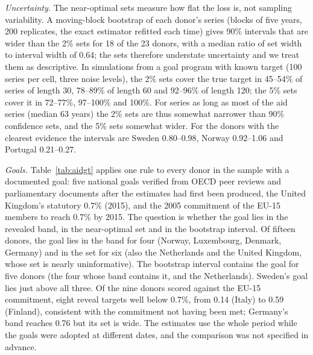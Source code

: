 \documentclass[pdflatex,sn-basic]{sn-jnl}
\theoremstyle{thmstyleone}\newtheorem{proposition}{Proposition}\newtheorem{theorem}{Theorem}
\theoremstyle{thmstylethree}\newtheorem{remark}{Remark}
\begin{document}
\emph{Uncertainty.} The near-optimal sets measure how flat the loss is, not sampling variability. A moving-block bootstrap of each donor's series (blocks of five years, 200 replicates, the exact estimator refitted each time) gives 90\% intervals that are wider than the 2\% sets for 18 of the 23 donors, with a median ratio of set width to interval width of 0.64; the sets therefore understate uncertainty and we treat them as descriptive. In simulations from a goal program with known target (100 series per cell, three noise levels), the 2\% sets cover the true target in 45--54\% of series of length 30, 78--89\% of length 60 and 92--96\% of length 120; the 5\% sets cover it in 72--77\%, 97--100\% and 100\%. For series as long as most of the aid series (median 63 years) the 2\% sets are thus somewhat narrower than 90\% confidence sets, and the 5\% sets somewhat wider. For the donors with the clearest evidence the intervals are Sweden 0.80--0.98, Norway 0.92--1.06 and Portugal 0.21--0.27.

\emph{Goals.} Table~\ref{tab:aidgt} applies one rule to every donor in the sample with a documented goal: five national goals verified from OECD peer reviews and parliamentary documents after the estimates had first been produced, the United Kingdom's statutory 0.7\% (2015), and the 2005 commitment of the EU-15 members to reach 0.7\% by 2015. The question is whether the goal lies in the revealed band, in the near-optimal set and in the bootstrap interval. Of fifteen donors, the goal lies in the band for four (Norway, Luxembourg, Denmark, Germany) and in the set for six (also the Netherlands and the United Kingdom, whose set is nearly uninformative). The bootstrap interval contains the goal for five donors (the four whose band contains it, and the Netherlands). Sweden's goal lies just above all three. Of the nine donors scored against the EU-15 commitment, eight reveal targets well below 0.7\%, from 0.14 (Italy) to 0.59 (Finland), consistent with the commitment not having been met; Germany's band reaches 0.76 but its set is wide. The estimates use the whole period while the goals were adopted at different dates, and the comparison was not specified in advance.
\end{document}
